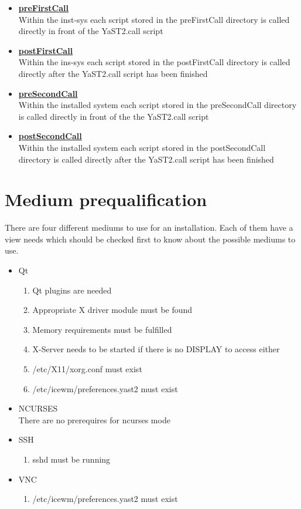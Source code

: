 \begin{itemize}
\item \textbf{\underline{preFirstCall}}\\
	Within the inst-sys each script stored in the preFirstCall directory is
	called directly in front of the YaST2.call script
\item \textbf{\underline{postFirstCall}}\\
	Within the ins-sys each script stored in the postFirstCall directory is
	called directly after the YaST2.call script has been finished
\item \textbf{\underline{preSecondCall}}\\
	Within the installed system each script stored in the preSecondCall
	directory is called directly in front of the the YaST2.call script
\item \textbf{\underline{postSecondCall}}\\
	Within the installed system each script stored in the postSecondCall
	directory is called directly after the YaST2.call script has been
	finished
\end{itemize}

\section{Medium prequalification}
There are four different mediums to use for an installation. Each
of them have a view needs which should be checked first to know
about the possible mediums to use.

\begin{itemize}
\item Qt
	\begin{enumerate}
	\item Qt plugins are needed
	\item Appropriate X driver module must be found
	\item Memory requirements must be fulfilled
	\item X-Server needs to be started if there is no DISPLAY to access either
	\item /etc/X11/xorg.conf must exist
	\item /etc/icewm/preferences.yast2 must exist
	\end{enumerate}
\item NCURSES\\
	There are no prerequires for ncurses mode
\item SSH
	\begin{enumerate}
	\item sshd must be running
	\end{enumerate}
\item VNC
	\begin{enumerate}
	\item /etc/icewm/preferences.yast2 must exist
	\end{enumerate}
\end{itemize}


